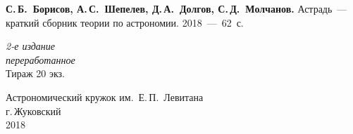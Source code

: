 \setcounter{page}{1}
\thispagestyle{empty}
\vspace*{1cm}
{\hspace{1pc} {\bfseries С.\,Б.~Борисов, А.\,С.~Шепелев, Д.\,А.~Долгов, С.\,Д.~Молчанов.} Астрадь~--- краткий сборник теории по астрономии. 2018~---~62~с.} 
\vskip3cm
\begin{center}
	{\slshape 2-е издание\\
	переработанное}\\[5mm]
	\small  Тираж 20 экз.
\end{center}
\vskip5cm
\begin{center}
Астрономический кружок им.~Е.\,П.~Левитана\\[3mm]
г.\,Жуковский\\[1cm]
	2018
\end{center}
\newpage
